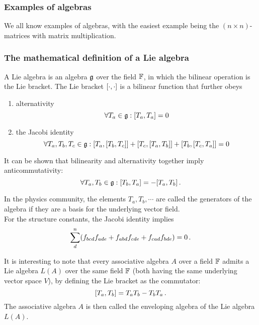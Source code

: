     \subsubsection{Examples of algebras}
        We all know examples of algebras, with the easiest example being the $(n \times n)$-matrices with matrix multiplication. \\

    \subsubsection{The mathematical definition of a Lie algebra}
        A Lie algebra is an algebra $\operatorname{\mathfrak{g}}$ over the field $\mathbb{F}$, in which the bilinear operation is the Lie bracket. The Lie bracket $\comm{\cdot}{\cdot}$ is a bilinear function that further obeys
        \begin{enumerate}
            \item alternativity
            \begin{equation}
                \forall T_a \in \glie: \comm{T_a}{T_a} = 0
            \end{equation}

            \item the Jacobi identity
            \begin{equation}
                \forall T_a, T_b, T_c \in \glie: \comm{T_a}{\comm{T_b}{T_c}} + \comm{T_c}{\comm{T_a}{T_b}} + \comm{T_b}{\comm{T_c}{T_a}} = 0
            \end{equation}
        \end{enumerate}

        It can be shown that bilinearity and alternativity together imply anticommutativity:
        \begin{equation}
            \forall T_a, T_b \in \glie: \comm{T_b}{T_a} = - \comm{T_a}{T_b} \thinspace .
        \end{equation}

        In the physics community, the elements $T_a, T_b, \cdots$ are called the generators of the algebra if they are a basis for the underlying vector field. \\

        For the structure constants, the Jacobi identity implies
        \begin{equation}
            \sum_d^n (f_{bcd} f_{ade} + f_{abd} f_{cde} + f_{cad} f_{bde}) = 0 \thinspace .
        \end{equation}

        It is interesting to note that every associative algebra $A$ over a field $\mathbb{F}$ admits a Lie algebra $L(A)$ over the same field $\mathbb{F}$ (both having the same underlying vector space $V$), by defining the Lie bracket as the commutator:
        \begin{equation}
            \comm{T_a}{T_b} = T_a T_b - T_b T_a \thinspace .
        \end{equation}
        The associative algebra $A$ is then called the enveloping algebra of the Lie algebra $L(A)$.
